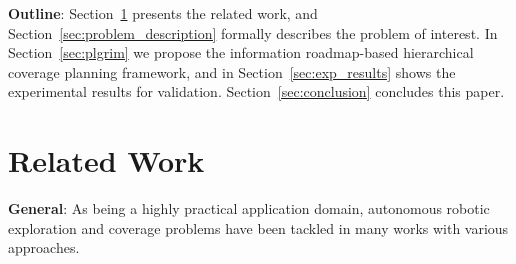 \documentclass{article}
\newcommand{\ph}[1]{{\textbf{#1}:}} %
\begin{document}
\ph{Outline}
Section~\ref{sec:related_work} presents the related work, and Section~\ref{sec:problem_description} formally describes the problem of interest.
In Section~\ref{sec:plgrim} we propose the information roadmap-based hierarchical coverage planning framework, and in Section~\ref{sec:exp_results} shows the experimental results for validation.
Section~\ref{sec:conclusion} concludes this paper.



\section{Related Work}\label{sec:related_work}

\ph{General}
As being a highly practical application domain, autonomous robotic exploration and coverage problems have been tackled in many works with various approaches. 
\end{document}
